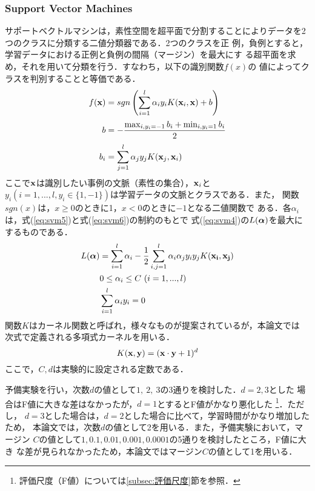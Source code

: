 \documentclass[japanese]{jnlp_1.3e}
\begin{document}
\subsubsection{Support Vector Machines}
サポートベクトルマシンは，素性空間を超平面で分割することによりデータを2 
つのクラスに分類する二値分類器である\cite{SVM,tinysvm}．2つのクラスを正
例，負例とすると，学習データにおける正例と負例の間隔（マージン）を最大にす
る超平面を求め，それを用いて分類を行う．すなわち，以下の識別関数$f(x)$の
値によってクラスを判別することと等価である．
{\allowdisplaybreaks
\begin{align}
  \label{eq:svm1}
  f({\bf x}) & =  sgn \left( \sum^{l}_{i=1} \alpha_i y_i K({\bf x}_i,{\bf x}) + b \right)\\[0.5ex]
  b & =  -\frac{\max_{i,y_i=-1}b_i + \min_{i,y_i=1}b_i}{2}\nonumber\\[0.5ex]
  b_i & =  \sum^l_{j=1} \alpha_j y_j K({\bf x}_j,{\bf x}_i) \nonumber
\end{align}
}
ここで${\bf x}$は識別したい事例の文脈（素性の集合），${\bf x}_{i}$と
$y_i(i=1,...,l, y_i\in\{1,-1\})$は学習データの文脈とクラスである．また，
関数$sgn(x)$は，$x \geq 0$のときに1，$x < 0$のときに$-1$となる二値関数で
ある．各$\alpha_i$は，式(\ref{eq:svm5})と式(\ref{eq:svm6})の制約のもとで
式(\ref{eq:svm4})の$L(\mbox{\boldmath $\alpha$})$を最大にするものである．
\begin{align}
  L(\mbox{\boldmath $\alpha$}) & = \sum^l_{i=1} \alpha_i - \frac{1}{2} \sum^l_{i,j=1} \alpha_i \alpha_j y_i y_j K({\bf x_i},{\bf x_j})
  \label{eq:svm4}\\
  & 0 \leq \alpha_i \leq C \, \, (i=1,...,l)
  \label{eq:svm5}\\
  & \sum^l_{i=1} \alpha_i y_i = 0 
  \label{eq:svm6}
\end{align}
関数$K$はカーネル関数と呼ばれ，様々なものが提案されているが，本論文では
次式で定義される多項式カーネルを用いる．
\begin{equation}
  \label{eq:svm3}
  K({\bf x},{\bf y})  = ({\bf x}\cdot{\bf y} + 1)^d
\end{equation}
ここで，$C,d$は実験的に設定される定数である．

予備実験を行い，次数$d$の値として$1,\ 2,\ 3$の3通りを検討した．$d=2,3$とした
場合はF値に大きな差はなかったが，$d=1$とするとF値がかなり悪化した
\footnote{評価尺度（F値）については\ref{subsec:評価尺度}節を参照．}．ただし，
$d=3$とした場合は，$d=2$とした場合に比べて，学習時間がかなり増加したため，
本論文では，次数$d$の値として2を用いる．また，予備実験において，マージン
$C$の値として$1,0.1,0.01,0.001,0.0001$の5通りを検討したところ，F値に大き
な差が見られなかったため，本論文ではマージン$C$の値として1を用いる．
\end{document}
